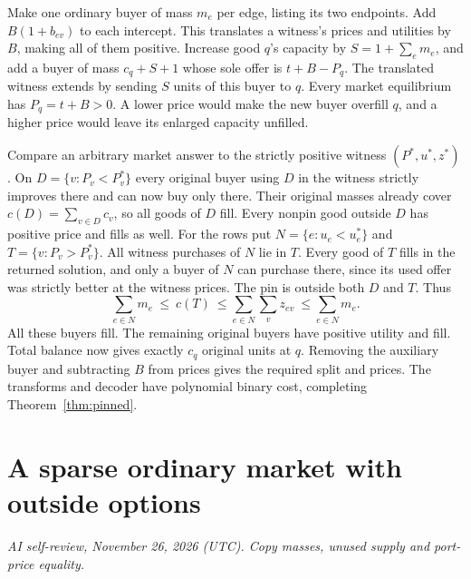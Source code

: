 \documentclass[11pt,oneside,openany,notitlepage]{report}
\newcommand{\reviewdate}{November 26, 2026 (UTC)}
\newcommand{\reviewmark}[1]{\par\nopagebreak[4]\noindent
  {\footnotesize\itshape AI self-review, \reviewdate. #1\par}\nobreak\smallskip}
\begin{document}
Make one ordinary buyer of mass \(m_e\) per edge, listing its two
endpoints. Add \(B(1+b_{ev})\) to each intercept. This translates a
witness's prices and utilities by \(B\), making all of them positive.
Increase good \(q\)'s capacity by \(S=1+\sum_e m_e\), and add a buyer of
mass \(c_q+S+1\) whose sole offer is \(t+B-P_q\). The translated witness
extends by sending \(S\) units of this buyer to \(q\). Every market
equilibrium has \(P_q=t+B>0\). A lower price would make the new buyer
overfill \(q\), and a higher price would leave its enlarged capacity unfilled.

Compare an arbitrary market answer to the strictly positive witness
\((P^*,u^*,z^*)\). On \(D=\{v:P_v<P_v^*\}\) every original buyer using
\(D\) in the witness strictly improves there and can now buy only there.
Their original masses already cover \(c(D)=\sum_{v\in D}c_v\), so all
goods of \(D\) fill. Every nonpin good outside \(D\) has positive price
and fills as well. For the rows put \(N=\{e:u_e<u_e^*\}\) and
\(T=\{v:P_v>P_v^*\}\). All witness purchases of \(N\) lie in \(T\).
Every good of \(T\) fills in the returned solution, and only a buyer of
\(N\) can purchase there, since its used offer was strictly better at the
witness prices. The pin is outside both \(D\) and \(T\). Thus
\[
 \sum_{e\in N}m_e\ \le\ c(T)\
 \le\sum_{e\in N}\sum_v z_{ev}\ \le\sum_{e\in N}m_e .
\]
All these buyers fill. The remaining original buyers have positive utility
and fill. Total balance now gives exactly \(c_q\) original units at \(q\).
Removing the auxiliary buyer and subtracting \(B\) from prices gives the
required split and prices. The transforms and decoder have polynomial
binary cost, completing Theorem~\ref{thm:pinned}.

\section{A sparse ordinary market with outside options}
\reviewmark{Copy masses, unused supply and port-price equality.}
\end{document}
